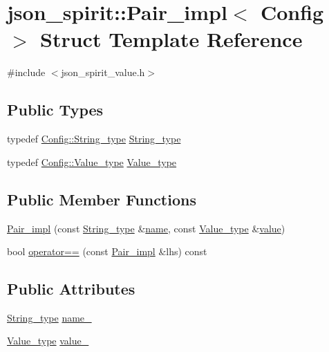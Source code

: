 \hypertarget{structjson__spirit_1_1_pair__impl}{}\section{json\+\_\+spirit\+:\+:Pair\+\_\+impl$<$ Config $>$ Struct Template Reference}
\label{structjson__spirit_1_1_pair__impl}


{\ttfamily \#include $<$json\+\_\+spirit\+\_\+value.\+h$>$}

\subsection*{Public Types}
\begin{DoxyCompactItemize}
\item 
typedef \hyperlink{structjson__spirit_1_1_config__vector_a9f0a96da6042290c5bc25c1b3269e747}{Config\+::\+String\+\_\+type} \hyperlink{structjson__spirit_1_1_pair__impl_a76ee499775d02d1038a2b8c71621f2c8}{String\+\_\+type}
\item 
typedef \hyperlink{structjson__spirit_1_1_config__vector_aa06382368ae0d04aa77534d6f73592c8}{Config\+::\+Value\+\_\+type} \hyperlink{structjson__spirit_1_1_pair__impl_aa679fec3c6ec4c76f94460d3815cf1fb}{Value\+\_\+type}
\end{DoxyCompactItemize}
\subsection*{Public Member Functions}
\begin{DoxyCompactItemize}
\item 
\hyperlink{structjson__spirit_1_1_pair__impl_a17be0aede10233fadd376a3fb77fd962}{Pair\+\_\+impl} (const \hyperlink{structjson__spirit_1_1_pair__impl_a76ee499775d02d1038a2b8c71621f2c8}{String\+\_\+type} \&\hyperlink{testharness_8cc_a8f8f80d37794cde9472343e4487ba3eb}{name}, const \hyperlink{structjson__spirit_1_1_pair__impl_aa679fec3c6ec4c76f94460d3815cf1fb}{Value\+\_\+type} \&\hyperlink{cache_8cc_a0f61d63b009d0880a89c843bd50d8d76}{value})
\item 
bool \hyperlink{structjson__spirit_1_1_pair__impl_ad089882177e46e07ac096328573e1f4c}{operator==} (const \hyperlink{structjson__spirit_1_1_pair__impl}{Pair\+\_\+impl} \&lhs) const 
\end{DoxyCompactItemize}
\subsection*{Public Attributes}
\begin{DoxyCompactItemize}
\item 
\hyperlink{structjson__spirit_1_1_pair__impl_a76ee499775d02d1038a2b8c71621f2c8}{String\+\_\+type} \hyperlink{structjson__spirit_1_1_pair__impl_ac39e926ac119e19889bdc44958a707da}{name\+\_\+}
\item 
\hyperlink{structjson__spirit_1_1_pair__impl_aa679fec3c6ec4c76f94460d3815cf1fb}{Value\+\_\+type} \hyperlink{structjson__spirit_1_1_pair__impl_aa669eda030541a05d8736db0839925e1}{value\+\_\+}
\end{DoxyCompactItemize}


